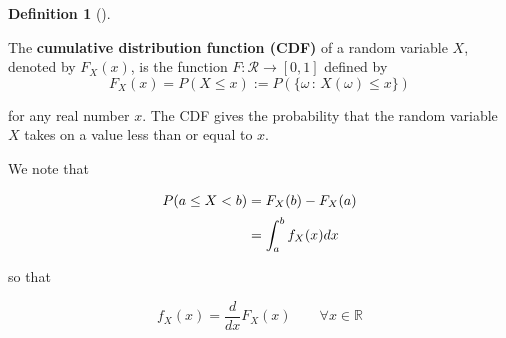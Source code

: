 \documentclass[
  letterpaper,
  DIV=11,
  numbers=noendperiod]{scrreport}
\theoremstyle{definition}
\theoremstyle{plain}
\theoremstyle{plain}
\theoremstyle{definition}
\newtheorem{definition}{Definition}[chapter]
\theoremstyle{remark}
\begin{document}
\begin{tcolorbox}[enhanced jigsaw, opacitybacktitle=0.6, bottomtitle=1mm, opacityback=0, toprule=.15mm, colbacktitle=quarto-callout-note-color!10!white, colback=white, left=2mm, title={Cumulative Distribution Function (CDF)}, breakable, rightrule=.15mm, leftrule=.75mm, titlerule=0mm, colframe=quarto-callout-note-color-frame, arc=.35mm, coltitle=black, toptitle=1mm, bottomrule=.15mm]

\begin{definition}[]\protect\hypertarget{def-cdf}{}\label{def-cdf}

The \textbf{cumulative distribution function (CDF)} of a random variable
\(X\), denoted by \(F_X(x)\), is the function
\(F: \mathcal R \to [0,1]\) defined by \[
F_X(x) = P(X \le x):=P(\{\omega\,:\,X(\omega)\leq x\})
\]

for any real number \(x\). The CDF gives the probability that the random
variable \(X\) takes on a value less than or equal to \(x\).

\end{definition}

\end{tcolorbox}

We note that

\[
\begin{aligned}
P(a \leq X <b ) &= F_X(b) - F_X(a)\\
\rule{0in}{4ex}    &= \int_a^b f_X(x) dx  
\end{aligned}
\]

so that

\[
f_X(x) = \frac{d}{dx} F_X(x)\qquad \forall x \in \mathbb R
\]
\end{document}
